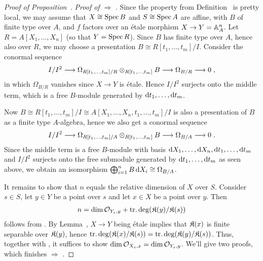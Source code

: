 \documentclass[a4paper,parskip=half,numbers=enddot, DIV=12]{scrreprt}
\begin{document}
\begin{proof}[Proof of Proposition~]
	\emph{Proof of  $\Rightarrow$ }. Since the property from Definition~ is pretty local, we may assume that $X\cong \operatorname{Spec} B$ and $S\cong \operatorname{Spec} A$ are affine, with $B$ of finite type over $A$, and $f$ factors over an étale morphism $X\morphism Y=\IA_A^n$. Let $R=A[X_1,\ldots,X_n]$ (so that $Y=\operatorname{Spec} R$). Since $B$ has finite type over $A$, hence also over $R$, we may choose a presentation $B\cong R[t_1,\ldots,t_m]/I$. Consider the conormal sequence
	\begin{align*}
		I/I^2\morphism \Omega_{R[t_1,\ldots,t_m]/R}\otimes_{R[t_1,\ldots,t_m]}B\morphism \Omega_{B/R}\morphism 0\;,
	\end{align*}
	in which $\Omega_{B/R}$ vanishes since $X\to Y$ is étale. Hence $I/I^2$ surjects onto the middle term, which is a free $B$-module generated by $\mathop{}\!\mathrm{d} t_1,\ldots,\mathop{}\!\mathrm{d} t_m$.
	
	Now $B\cong R[t_1,\ldots,t_m]/I\cong A[X_1,\ldots,X_n,t_1,\ldots,t_m]/I$ is also a presentation of $B$ as a finite type $A$-algebra, hence we also get a conormal sequence
	\begin{align*}
		I/I^2\morphism \Omega_{R[t_1,\ldots,t_m]/A}\otimes_{R[t_1,\ldots,t_m]}B\morphism \Omega_{B/A}\morphism 0\;.
	\end{align*}
	Since the middle term is a free $B$-module with basis $\mathop{}\!\mathrm{d} X_1,\ldots,\mathop{}\!\mathrm{d} X_n,\mathop{}\!\mathrm{d} t_1,\ldots,\mathop{}\!\mathrm{d} t_m$ and $I/I^2$ surjects onto the free submodule generated by $\mathop{}\!\mathrm{d} t_1,\ldots,\mathop{}\!\mathrm{d} t_m$ as seen above, we obtain an isomorphism $\bigoplus_{i=1}^nB\mathop{}\!\mathrm{d} X_i\cong \Omega_{B/A}$. 
	
	It remains to show that $n$ equals the relative dimension of $X$ over $S$. Consider $s\in S$, let $y\in Y$ be a point over $s$ and let $x\in X$ be a point over $y$. Then
	\begin{align}\lbl{eq:Anndim}
		n=\dim\Oo_{Y_s,y}+\trdeg(\KK(y)/\KK(s))
	\end{align}
	follows from \cite[Theorem~10]{alg1}. By Lemma~, $X\to Y$ being étale implies that $\mathfrak{K}(x)$ is finite separable over $\mathfrak{K}(y)$, hence $\operatorname{tr.deg}(\mathfrak{K}(x)/\mathfrak{K}(s))=\operatorname{tr.deg}(\mathfrak{K}(y)/\mathfrak{K}(s))$. Thus, together with , it suffices to show $\dim\mathcal{O}_{X_s,x}=\dim\mathcal{O}_{Y_s,y}$. We'll give two proofs, which finishes  $\Rightarrow$ .
	

\end{proof}
\end{document}
